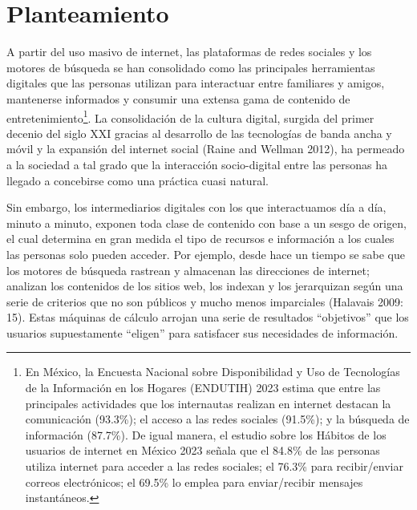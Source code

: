 \documentclass[
]{interact}
\begin{document}
\section{Planteamiento}\label{planteamiento}

A partir del uso masivo de internet, las plataformas de redes sociales y
los motores de búsqueda se han consolidado como las principales
herramientas digitales que las personas utilizan para interactuar entre
familiares y amigos, mantenerse informados y consumir una extensa gama
de contenido de entretenimiento\footnote{En México, la Encuesta Nacional
  sobre Disponibilidad y Uso de Tecnologías de la Información en los
  Hogares (ENDUTIH) 2023 estima que entre las principales actividades
  que los internautas realizan en internet destacan la comunicación
  (93.3\%); el acceso a las redes sociales (91.5\%); y la búsqueda de
  información (87.7\%). De igual manera, el estudio sobre los Hábitos de
  los usuarios de internet en México 2023 señala que el 84.8\% de las
  personas utiliza internet para acceder a las redes sociales; el 76.3\%
  para recibir/enviar correos electrónicos; el 69.5\% lo emplea para
  enviar/recibir mensajes instantáneos.}. La consolidación de la cultura
digital, surgida del primer decenio del siglo XXI gracias al desarrollo
de las tecnologías de banda ancha y móvil y la expansión del internet
social (Raine and Wellman 2012), ha permeado a la sociedad a tal grado
que la interacción socio-digital entre las personas ha llegado a
concebirse como una práctica cuasi natural.

Sin embargo, los intermediarios digitales con los que interactuamos día
a día, minuto a minuto, exponen toda clase de contenido con base a un
sesgo de origen, el cual determina en gran medida el tipo de recursos e
información a los cuales las personas solo pueden acceder. Por ejemplo,
desde hace un tiempo se sabe que los motores de búsqueda rastrean y
almacenan las direcciones de internet; analizan los contenidos de los
sitios web, los indexan y los jerarquizan según una serie de criterios
que no son públicos y mucho menos imparciales (Halavais 2009: 15). Estas
máquinas de cálculo arrojan una serie de resultados ``objetivos'' que
los usuarios supuestamente ``eligen'' para satisfacer sus necesidades de
información.
\end{document}
